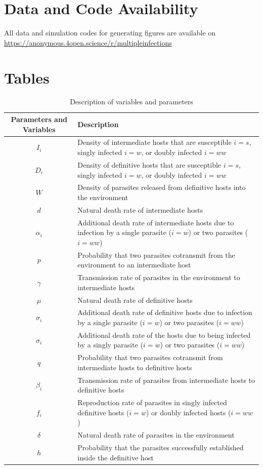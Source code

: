 \documentclass[a4paper]{scrartcl}
\begin{document}
\section*{Data and Code Availability}
All data and simulation codes for generating figures are available on 
\url{https://anonymous.4open.science/r/multipleinfections}




\section*{Tables}
\renewcommand{\thetable}{\arabic{table}}
\setcounter{table}{0}

\begin{table}[!ht]
\caption{Description of variables and parameters}
\label{table:varpardescription}
\centering
\begin{tabular}{c|p{10cm}}%
\hline
Parameters and Variables    &  Description  \\
\hline
$I_i$  & Density of intermediate hosts that are susceptible $i=s$, singly infected $i=w$, or doubly infected $i=ww$ \\
\hline
$D_i$ & Density of definitive hosts that are susceptible $i=s$, singly infected $i=w$, or doubly infected $i=ww$ \\
\hline
$W$ & Density of parasites released from definitive hosts into the environment \\
\hline
$d$ & Natural death rate of intermediate hosts \\
\hline
$\alpha_i$ & Additional death rate of intermediate hosts due to infection by a single parasite ($i = w$) or two parasites ($i = ww$) \\
\hline
$p$ & Probability that two parasites cotransmit from the environment to an intermediate host \\
\hline
$\gamma$ & Transmission rate of parasites in the environment to intermediate hosts \\
\hline
$\mu$ & Natural death rate of definitive hosts \\
\hline
$\sigma_i$ & Additional death rate of definitive hosts due to infection by a single parasite ($i = w$) or two parasites ($i = ww$) \\
\hline
$\sigma_i$ & Additional death rate of the hosts due to being infected by a singly parasite ($i = w$) or two parasites ($i = ww$) \\
\hline
$q$ & Probability that two parasites cotransmit from intermediate hosts to definitive hosts \\
\hline
$\beta_i$ & Transmission rate of parasites from intermediate hosts to definitive hosts \\
\hline
$f_i$ & Reproduction rate of parasites in singly infected definitive hosts ($i = w$) or doubly infected hosts ($i = ww$)\\
\hline
$\delta$ & Natural death rate of parasites in the environment \\
\hline 
$h$ & Probability that the parasites successfully established inside the definitive host 
\end{tabular}
\bigskip{}\\
\end{table}
\end{document}

